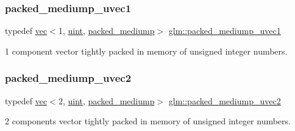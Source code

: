 \subsubsection{\texorpdfstring{packed\+\_\+mediump\+\_\+uvec1}{packed\_mediump\_uvec1}}
{\footnotesize\ttfamily typedef \mbox{\hyperlink{structglm_1_1vec}{vec}}$<$1, \mbox{\hyperlink{group__core__precision_ga4fd29415871152bfb5abd588334147c8}{uint}}, \mbox{\hyperlink{namespaceglm_a36ed105b07c7746804d7fdc7cc90ff25a9604654c3b137cd7898689fd34b25bc0}{packed\+\_\+mediump}}$>$ \mbox{\hyperlink{group__gtc__type__aligned_ga2fd382e54fcf213b330d448f83738636}{glm\+::packed\+\_\+mediump\+\_\+uvec1}}}



1 component vector tightly packed in memory of unsigned integer numbers. 

\mbox{\label{group__gtc__type__aligned_ga18dd6e7cd05a4239428b2a0751d48d4a}} 
\subsubsection{\texorpdfstring{packed\+\_\+mediump\+\_\+uvec2}{packed\_mediump\_uvec2}}
{\footnotesize\ttfamily typedef \mbox{\hyperlink{structglm_1_1vec}{vec}}$<$2, \mbox{\hyperlink{group__core__precision_ga4fd29415871152bfb5abd588334147c8}{uint}}, \mbox{\hyperlink{namespaceglm_a36ed105b07c7746804d7fdc7cc90ff25a9604654c3b137cd7898689fd34b25bc0}{packed\+\_\+mediump}}$>$ \mbox{\hyperlink{group__gtc__type__aligned_ga18dd6e7cd05a4239428b2a0751d48d4a}{glm\+::packed\+\_\+mediump\+\_\+uvec2}}}



2 components vector tightly packed in memory of unsigned integer numbers. 

\mbox{\label{group__gtc__type__aligned_gaa79317c123076b994c5c1b46a5b41351}} 
